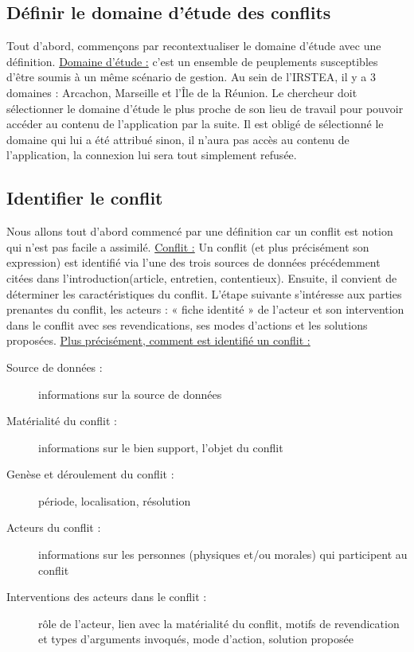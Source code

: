 \documentclass[12pt,a4paper]{article}
\begin{document}
\subsection{Définir le domaine d'étude des conflits}
Tout d'abord, commençons par recontextualiser le domaine d'étude avec une définition. \newline
\underline{Domaine d'étude :} c'est un ensemble de peuplements susceptibles d'être soumis à un même scénario de gestion. \newline
Au sein de l'IRSTEA, il y a 3 domaines : Arcachon, Marseille et l'Île de la Réunion. 
Le chercheur doit sélectionner le domaine d'étude le plus proche de son lieu de travail pour pouvoir accéder au contenu de l'application par la suite. Il est obligé de sélectionné le domaine qui lui a été attribué sinon, il n'aura pas accès au contenu de l'application, la connexion lui sera tout simplement refusée. 

\subsection{Identifier le conflit}
Nous allons tout d'abord commencé par une définition car un conflit est notion qui n'est pas facile a assimilé. \newline
\underline{Conflit :} Un conflit (et plus précisément son expression) est identifié via l’une des trois sources de données précédemment citées dans l'introduction(article, entretien, contentieux). Ensuite, il convient de déterminer les caractéristiques du conflit. L’étape suivante s'intéresse aux parties prenantes du conflit, les acteurs : « fiche identité » de l’acteur et son intervention dans le conflit avec ses revendications, ses modes d’actions et les solutions proposées. \newline 
\underline{Plus précisément, comment est identifié un conflit :}
\begin{description}
\item[Source de données :] informations sur la source de données
\item[Matérialité du conflit :] informations sur le bien support, l’objet du conflit
\item[Genèse et déroulement du conflit :] période, localisation, résolution 
\item[Acteurs du conflit :] informations sur les personnes (physiques et/ou morales) qui participent au conflit
\item[Interventions des acteurs dans le conflit :] rôle de l’acteur, lien avec la matérialité du conflit, motifs de revendication et types d’arguments invoqués, mode d’action, solution proposée \newline \newline
\end{description}
\end{document}
